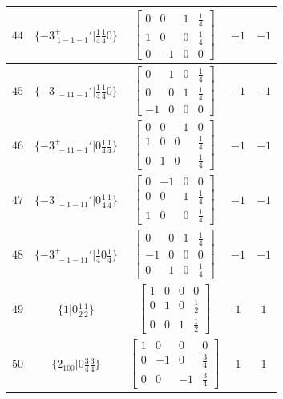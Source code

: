 \documentclass[fleqn,8pt]{jsarticle}
\begin{document}
\begin{longtable}{ccccc}
$ 44 $ & $ \{-3^{+}_{\,\,1-1-1}{}'|\frac{1}{4} \frac{1}{4} 0\} $ & $ \begin{bmatrix} 0 & 0 & 1 & \frac{1}{4} \\ 1 & 0 & 0 & \frac{1}{4} \\ 0 & -1 & 0 & 0 \end{bmatrix} $ & $ -1 $ & $ -1 $ \\ \hline
$ 45 $ & $ \{-3^{-}_{\,\,-11-1}{}'|\frac{1}{4} \frac{1}{4} 0\} $ & $ \begin{bmatrix} 0 & 1 & 0 & \frac{1}{4} \\ 0 & 0 & 1 & \frac{1}{4} \\ -1 & 0 & 0 & 0 \end{bmatrix} $ & $ -1 $ & $ -1 $ \\ \hline
$ 46 $ & $ \{-3^{+}_{\,\,-11-1}{}'|0 \frac{1}{4} \frac{1}{4}\} $ & $ \begin{bmatrix} 0 & 0 & -1 & 0 \\ 1 & 0 & 0 & \frac{1}{4} \\ 0 & 1 & 0 & \frac{1}{4} \end{bmatrix} $ & $ -1 $ & $ -1 $ \\ \hline
$ 47 $ & $ \{-3^{-}_{\,\,-1-11}{}'|0 \frac{1}{4} \frac{1}{4}\} $ & $ \begin{bmatrix} 0 & -1 & 0 & 0 \\ 0 & 0 & 1 & \frac{1}{4} \\ 1 & 0 & 0 & \frac{1}{4} \end{bmatrix} $ & $ -1 $ & $ -1 $ \\ \hline
$ 48 $ & $ \{-3^{+}_{\,\,-1-11}{}'|\frac{1}{4} 0 \frac{1}{4}\} $ & $ \begin{bmatrix} 0 & 0 & 1 & \frac{1}{4} \\ -1 & 0 & 0 & 0 \\ 0 & 1 & 0 & \frac{1}{4} \end{bmatrix} $ & $ -1 $ & $ -1 $ \\ \hline
$ 49 $ & $ \{1|0 \frac{1}{2} \frac{1}{2}\} $ & $ \begin{bmatrix} 1 & 0 & 0 & 0 \\ 0 & 1 & 0 & \frac{1}{2} \\ 0 & 0 & 1 & \frac{1}{2} \end{bmatrix} $ & $ 1 $ & $ 1 $ \\ \hline
$ 50 $ & $ \{2{}_{100}|0 \frac{3}{4} \frac{3}{4}\} $ & $ \begin{bmatrix} 1 & 0 & 0 & 0 \\ 0 & -1 & 0 & \frac{3}{4} \\ 0 & 0 & -1 & \frac{3}{4} \end{bmatrix} $ & $ 1 $ & $ 1 $ \\ \hline

\end{longtable}
\end{document}
